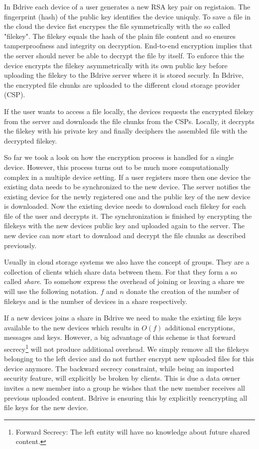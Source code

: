 In Bdrive each device of a user generates a new \ac{RSA} key pair on registaion. The fingerprint (hash) of the public key identifies the device uniquly. To save a file in the cloud the device fist encrypes the file symmetrically with the so called "filekey". The filekey equals the hash of the plain file content and so ensures tamperproofness and integrity on decryption. End-to-end encryption implies that the server should never be able to decrypt the file by itself. To enforce this the device encrypts the filekey asymmetrically with its own public key before uploading the filekey to the Bdrive server where it is stored securly. In Bdrive, the encrypted file chunks are uploaded to the different cloud storage provider (\ac{CSP}). 

If the user wants to access a file locally, the devices requests the encrypted filekey from the server and downloads the file chunks from the \ac{CSP}s. Locally, it decrypts the filekey with his private key and finally deciphers the assembled file with the decrypted filekey. 

So far we took a look on how the encryption process is handled for a single device. However, this process turns out to be much more computationally complex in a multiple device setting.  If a user registers more then one device the existing data needs to be synchronized to the new device. The server notifies the existing device for the newly registered one and the public key of the new device is downloaded. Now the existing device needs to download each filekey for each file of the user and decrypts it. The synchronization is finished by encrypting the filekeys with the new devices public key and uploaded again to the server. The new device can now start to download and decrypt the file chunks as described previously.

Usually in cloud storage systems we also have the concept of groups. They are a collection of clients which share data between them. For that they form a so called \textit{share}. To somehow express the overhead of joining or leaving a share we will use the following notation. $f$ and $n$ donate the creation of the number of filekeys and is the number of devices in a share respectively.

If a new devices joins a share in Bdrive we need to make the existing file keys available to the new devices which results in $O(f)$ additional encryptions, messages and keys. However, a big advantage of this scheme is that forward secrecy\footnote{Forward Secrecy: The left entity will have no knowledge about future shared content.} will not produce additional overhead. We simply remove all the filekeys belonging to the left device and do not further encrypt new uploaded files for this device anymore. The backward secrecy constraint, while being an imported security feature, will explicitly be broken by clients. This is due a data owner invites a new member into a group he wishes that the new member receives all previous uploaded content. Bdrive is ensuring this by explicitly reencrypting all file keys for the new device. 

